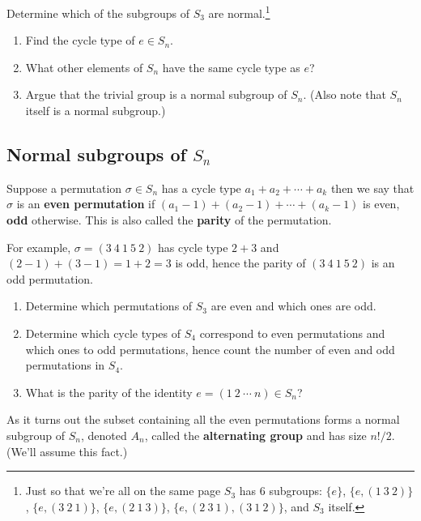 \begin{questions}[resume]
  \item Determine which of the subgroups of $ S_3$ are normal.\footnote{Just so that we're all on the same page $ S_3$ has 6 subgroups: $ \{ e \}$, $ \{ e, (1 \: 3 \: 2) \}$, $ \{ e,  (3 \: 2 \: 1) \}$, $ \{ e, (2 \: 1 \: 3) \}$, $ \{ e,  (2 \: 3 \: 1),  (3 \: 1 \: 2) \}$, and $ S_3$ itself.}
  
  \item 
  \begin{enumerate}
    \item Find the cycle type of $ e \in S_n$.
    \item What other elements of $ S_n$ have the same cycle type as $ e$?
    \item Argue that the trivial group is a normal subgroup of $ S_n$. (Also note that $ S_n$ itself is a normal subgroup.)
  \end{enumerate}
\end{questions}








\newpage
\subsection{Normal subgroups of $ S_n$}
Suppose a permutation $ \sigma \in S_n$ has a cycle type $ a_1 + a_2 + \cdots + a_k$ then we say that $ \sigma$ is an \textbf{even permutation} if $ (a_1 - 1) + (a_2 - 1) + \cdots + (a_k - 1)$ is even, \textbf{odd} otherwise. This is also called the \textbf{parity} of the permutation. 

For example, $ \sigma = (3 \: 4 \: 1 \: 5 \: 2)$ has cycle type $ 2 + 3$ and $ (2 - 1) + (3 - 1) = 1 + 2 = 3$ is odd, hence the parity of $(3 \: 4 \: 1 \: 5 \: 2)$ is an odd permutation.

\begin{questions}[resume]
  \item 
  \begin{enumerate}
    \item Determine which permutations of $ S_3$ are even and which ones are odd.
    \item Determine which cycle types of $ S_4$ correspond to even permutations and which ones to odd permutations, hence count the number of even and odd permutations in $ S_4$.
    \item What is the parity of the identity $ e = (1 \: 2 \: \cdots \: n) \in S_n$?
  \end{enumerate}
\end{questions}
As it turns out the subset containing all the even permutations forms a normal subgroup of $ S_n$, denoted $A_n$, called the \textbf{alternating group} and has size $ n!/2$. (We'll assume this fact.)

